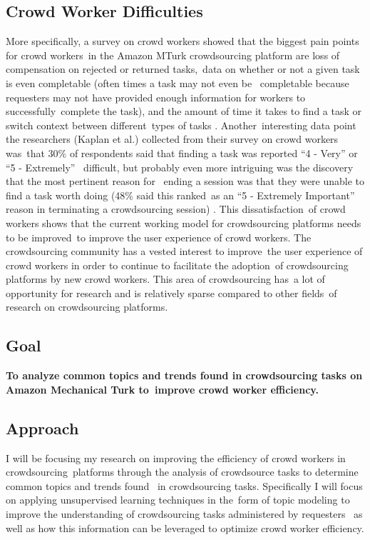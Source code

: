 \documentclass[letterpaper,12pt]{article}
\begin{document}
\subsection{Crowd Worker Difficulties}
More specifically, a survey on crowd workers showed that the biggest pain points for crowd workers\
in the Amazon MTurk crowdsourcing platform are loss of compensation on rejected or returned tasks,\
data on whether or not a given task is even completable (often times a task may not even be \
completable because requesters may not have provided enough information for workers to successfully\
complete the task), and the amount of time it takes to find a task or switch context between different\
types of tasks \cite{Kaplan2018}. Another\
interesting data point the researchers (Kaplan et al.) collected from their survey on crowd workers was\
that 30\% of respondents said that finding a task was reported ``4 - Very'' or ``5 - Extremely'' \
difficult, but probably even more intriguing was the discovery that the most pertinent reason for \
ending a session was that they were unable to find a task worth doing (48\% said this ranked\
as an ``5 - Extremely Important'' reason in terminating a crowdsourcing session) \cite{Kaplan2018}. This dissatisfaction\
of crowd workers shows that the current working model for crowdsourcing platforms needs to be improved\
to improve the user experience of crowd workers.
The crowdsourcing community has a vested interest to improve\
the user experience of crowd workers in order to continue to facilitate the adoption\
of crowdsourcing platforms by new crowd workers. This area of crowdsourcing has\
a lot of opportunity for research and is relatively sparse compared to other fields\
of research on crowdsourcing platforms.

\subsection{Goal}
\textbf{To analyze common topics and trends found in crowdsourcing tasks on Amazon Mechanical Turk to\
 improve crowd worker efficiency.}

\subsection{Approach}
I will be focusing my research on improving the efficiency of crowd workers in crowdsourcing\
platforms through the analysis of crowdsource tasks to determine common topics and trends found \
in crowdsourcing tasks. Specifically I will focus on applying unsupervised learning techniques in the\
form of topic modeling to improve the understanding of crowdsourcing tasks administered by requesters \ 
as well as how this information can be leveraged to optimize crowd worker efficiency. 
\end{document}
